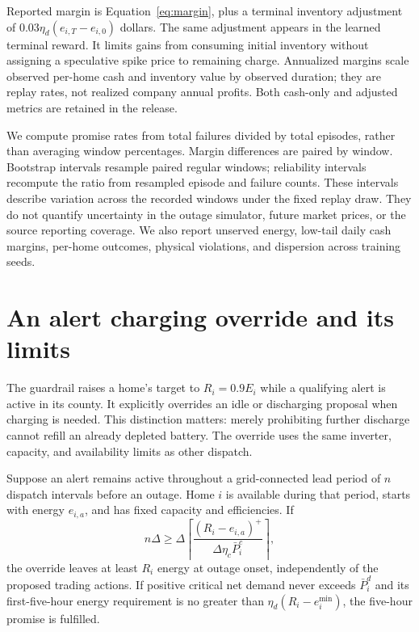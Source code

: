 Reported margin is Equation~\eqref{eq:margin}, plus a terminal inventory adjustment of $0.03\eta_d(e_{i,T}-e_{i,0})$ dollars. The same adjustment appears in the learned terminal reward. It limits gains from consuming initial inventory without assigning a speculative spike price to remaining charge. Annualized margins scale observed per-home cash and inventory value by observed duration; they are replay rates, not realized company annual profits. Both cash-only and adjusted metrics are retained in the release.

We compute promise rates from total failures divided by total episodes, rather than averaging window percentages. Margin differences are paired by window. Bootstrap intervals resample paired regular windows; reliability intervals recompute the ratio from resampled episode and failure counts. These intervals describe variation across the recorded windows under the fixed replay draw. They do not quantify uncertainty in the outage simulator, future market prices, or the source reporting coverage. We also report unserved energy, low-tail daily cash margins, per-home outcomes, physical violations, and dispersion across training seeds.

\section{An alert charging override and its limits}
\label{sec:guardrail}

The guardrail raises a home's target to $R_i=0.9E_i$ while a qualifying alert is active in its county. It explicitly overrides an idle or discharging proposal when charging is needed. This distinction matters: merely prohibiting further discharge cannot refill an already depleted battery. The override uses the same inverter, capacity, and availability limits as other dispatch.

\begin{proposition}
\label{prop:charging}
Suppose an alert remains active throughout a grid-connected lead period of $n$ dispatch intervals before an outage. Home $i$ is available during that period, starts with energy $e_{i,a}$, and has fixed capacity and efficiencies. If
\begin{equation}
 n\Delta\ge \Delta\left\lceil\frac{(R_i-e_{i,a})^+}{\Delta\eta_c\bar P_i^c}\right\rceil,
\end{equation}
the override leaves at least $R_i$ energy at outage onset, independently of the proposed trading actions. If positive critical net demand never exceeds $\bar P_i^d$ and its first-five-hour energy requirement is no greater than $\eta_d(R_i-e_i^{\min})$, the five-hour promise is fulfilled.
\end{proposition}

